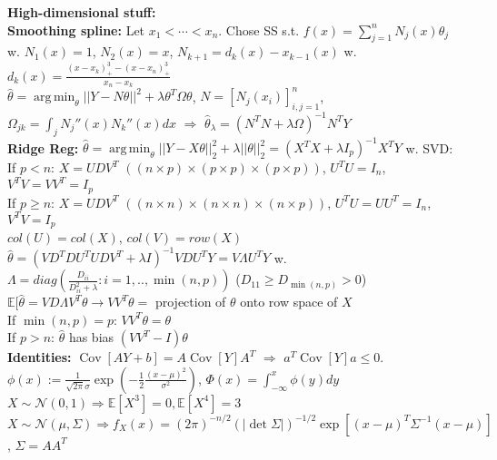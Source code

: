 \documentclass[11pt]{article}
\newcommand{\E}{\mathbb{E}}
\DeclareMathOperator*{\argmin}{arg\,min}
\DeclareMathOperator*{\cov}{Cov}
\begin{document}
\begin{multicols}{4}
\textbf{High-dimensional stuff:}\\

\textbf{Smoothing spline:} Let $x_1<\cdots<x_n$. Chose SS s.t. $f(x)=\sum^n_{j=1} N_j(x)\theta_j$ w. $N_1(x)=1$, $N_2(x)=x$, $N_{k+1}=d_k(x)-x_{k-1}(x)$ w. $d_k(x)=\frac{(x-x_k)^3_+ -(x-x_n)^3_+}{x_n-x_k}$\\
$\hat{\theta}=\argmin_\theta||Y-N\theta||^2+\lambda\theta^T\Omega\theta$, $N=[N_j(x_i)]_{i,j=1}^n$, $\Omega_{jk}=\int_j N_j''(x)N_k''(x)dx$ $\Rightarrow$ $\hat{\theta}_\lambda=(N^TN+\lambda\Omega)^{-1}N^TY$\\

\textbf{Ridge Reg:} $\hat{\theta}=\argmin_\theta||Y-X\theta||_2^2+\lambda||\theta||_2^2=(X^TX+\lambda I_p)^{-1}X^TY$ w. SVD:\\
If $p<n$: $X=UDV^T$ $((n\times p)\times(p\times p)\times(p\times p))$, $U^TU=I_n$, $V^TV=VV^T=I_p$\\
If $p\geq n$: $X=UDV^T$ $((n\times n)\times(n\times n)\times(n\times p))$, $U^TU=UU^T=I_n$, $V^TV=I_p$\\
$col(U)=col(X)$, $col(V)=row(X)$\\
$\hat{\theta}=(VD^TDU^TUDV^T+\lambda I)^{-1}VDU^TY=V\Lambda U^TY$ w. $\Lambda=diag(\frac{D_{ii}}{D_{ii}^2+\lambda}:i=1,..,\min(n,p))$ ($D_{11}\geq D_{\min(n,p)}>0$)\\
$\E[\hat{\theta}=VD\Lambda V^T\theta\rightarrow VV^T\theta=$ projection of $\theta$ onto row space of $X$\\
If $\min(n,p)=p$: $VV^T\theta=\theta$\\
If $p>n$: $\hat{\theta}$ has bias $(VV^T-I)\theta$\\

\textbf{Identities:} $\cov[AY+b]=A\cov[Y]A^T$ $\Rightarrow$ $a^T\cov[Y]a\leq 0$.\\
$\phi(x):=\frac{1}{\sqrt{2\pi}\sigma}\exp(-\frac{1}{2}\frac{(x-\mu)^2}{\sigma^2})$,
$\Phi(x)=\int^x_{-\infty}\phi(y)dy$\\
$X\sim\mathcal{N}(0,1)\Rightarrow\E[X^3]=0,\E[X^4]=3$\\
$X\sim\mathcal{N}(\mu,\Sigma)\Rightarrow f_X(x)=(2\pi)^{-n/2}(|\det \Sigma|)^{-1/2}\exp[(x-\mu)^T\Sigma^{-1}(x-\mu)]$, $\Sigma=AA^T$

\end{multicols}
\end{document}
